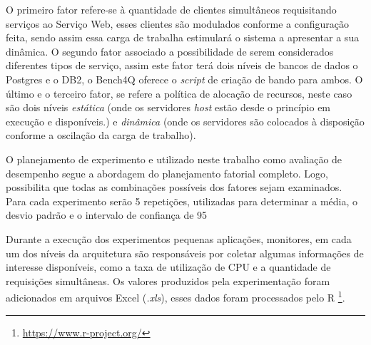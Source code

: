 O primeiro fator refere-se à quantidade de clientes simultâneos requisitando serviços ao Serviço Web, esses clientes são modulados conforme a configuração feita, sendo assim essa carga de trabalha estimulará o sistema a apresentar a sua dinâmica. O segundo fator associado a possibilidade de serem considerados diferentes tipos de serviço, assim este fator terá dois níveis de bancos de dados o Postgres e o DB2, o Bench4Q oferece o \textit{script} de criação de bando para ambos. O último e o terceiro fator, se refere a política de alocação de recursos, neste caso são dois níveis \textit{estática} (onde os servidores \textit{host} estão desde o princípio em execução e disponíveis.) e \textit{dinâmica} (onde os servidores são colocados à disposição conforme a oscilação da carga de trabalho).

O planejamento de experimento e utilizado neste trabalho como avaliação de desempenho segue a abordagem do planejamento fatorial completo. Logo, possibilita que todas as combinações possíveis dos fatores sejam examinados. Para cada experimento serão 5 repetições, utilizadas para determinar a média, o desvio padrão e o intervalo de confiança de 95%

Durante a execução dos experimentos pequenas aplicações, monitores, em cada um dos níveis da arquitetura são responsáveis por coletar algumas informações de interesse disponíveis, como a taxa de utilização de CPU e a quantidade de requisições simultâneas. Os valores produzidos pela experimentação foram adicionados em arquivos Excel (\textit{.xls}), esses dados foram processados pelo R \footnote{\url{https://www.r-project.org/}}.
